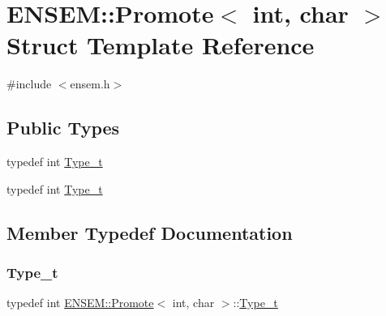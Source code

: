 \hypertarget{structENSEM_1_1Promote_3_01int_00_01char_01_4}{}\section{E\+N\+S\+EM\+:\+:Promote$<$ int, char $>$ Struct Template Reference}
\label{structENSEM_1_1Promote_3_01int_00_01char_01_4}


{\ttfamily \#include $<$ensem.\+h$>$}

\subsection*{Public Types}
\begin{DoxyCompactItemize}
\item 
typedef int \mbox{\hyperlink{structENSEM_1_1Promote_3_01int_00_01char_01_4_ac6a88a37a5f3bfdba13f61e4c901e8e0}{Type\+\_\+t}}
\item 
typedef int \mbox{\hyperlink{structENSEM_1_1Promote_3_01int_00_01char_01_4_ac6a88a37a5f3bfdba13f61e4c901e8e0}{Type\+\_\+t}}
\end{DoxyCompactItemize}


\subsection{Member Typedef Documentation}
\mbox{\label{structENSEM_1_1Promote_3_01int_00_01char_01_4_ac6a88a37a5f3bfdba13f61e4c901e8e0}} 
\subsubsection{\texorpdfstring{Type\_t}{Type\_t}\hspace{0.1cm}{\footnotesize\ttfamily [1/2]}}
{\footnotesize\ttfamily typedef int \mbox{\hyperlink{structENSEM_1_1Promote}{E\+N\+S\+E\+M\+::\+Promote}}$<$ int, char $>$\+::\mbox{\hyperlink{structENSEM_1_1Promote_3_01int_00_01char_01_4_ac6a88a37a5f3bfdba13f61e4c901e8e0}{Type\+\_\+t}}}

\mbox{\label{structENSEM_1_1Promote_3_01int_00_01char_01_4_ac6a88a37a5f3bfdba13f61e4c901e8e0}} 
